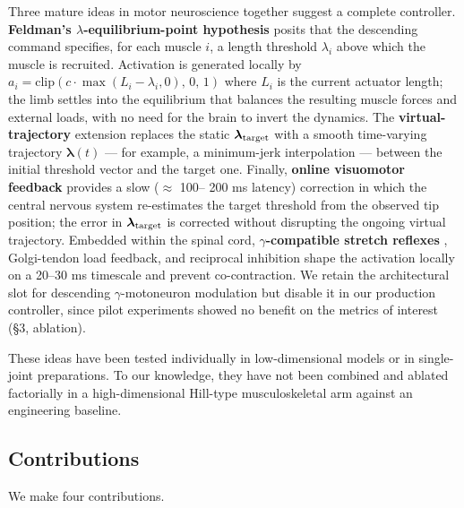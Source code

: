 \documentclass[sn-basic]{sn-jnl}
\begin{document}
Three mature ideas in motor neuroscience together suggest a complete
controller. \textbf{Feldman's $\lambda$-equilibrium-point hypothesis} \citep{feldman1966, feldman1986, bizzi1976} posits that the descending command
specifies, for each muscle \(i\), a length threshold \(\lambda_i\) above
which the muscle is recruited. Activation is generated locally by
\(a_i = \mathrm{clip}(c\cdot\max(L_i - \lambda_i, 0),\,0,\,1)\) where
\(L_i\) is the current actuator length; the limb settles into the
equilibrium that balances the resulting muscle forces and external
loads, with no need for the brain to invert the dynamics. The
\textbf{virtual-trajectory} extension \citep{feldmanlevin1995, latash1993} replaces the static \(\boldsymbol{\lambda}_{\rm target}\) with a
smooth time-varying trajectory \(\boldsymbol{\lambda}(t)\) --- for
example, a minimum-jerk interpolation --- between the initial threshold
vector and the target one. Finally, \textbf{online visuomotor feedback}
\citep{saundersknill2003, sarlegnasainburg2009} provides a slow ($\approx$
100-- 200 ms latency) correction in which the central nervous system
re-estimates the target threshold from the observed tip position; the
error in \(\boldsymbol{\lambda}_{\rm target}\) is corrected without
disrupting the ongoing virtual trajectory. Embedded within the spinal
cord, \textbf{$\gamma$-compatible stretch reflexes} \citep{prochazka1989, loeb1984}, Golgi-tendon load feedback, and reciprocal inhibition shape the
activation locally on a 20--30 ms timescale and prevent co-contraction.
We retain the architectural slot for descending $\gamma$-motoneuron modulation
\citep{prochazka1989} but disable it in our production controller, since
pilot experiments showed no benefit on the metrics of interest (§3,
ablation).

These ideas have been tested individually in low-dimensional models or
in single-joint preparations. To our knowledge, they have not been
combined and ablated factorially in a high-dimensional Hill-type
musculoskeletal arm against an engineering baseline.

\subsection{Contributions}

We make four contributions.
\end{document}
